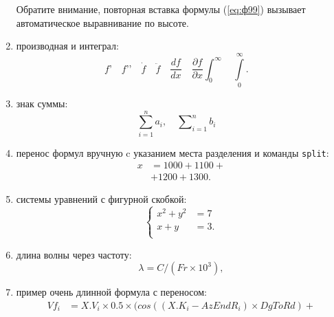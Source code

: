 \begin{enumerate}
Обратите внимание, повторная вставка формулы (\ref{eq:ф99}) вызывает автоматическое выравнивание по высоте.
\item производная и интеграл:
{\zerodisplayskips
	\begin{equation}	
	f’\quad f’’\quad
	\dot{f}\quad \ddot{f} \quad
	\frac{d f}{d x}\quad
	\frac{\partial f}{\partial x}
	\int_0^{\infty}\quad
	\int\limits_0^{\infty}.\quad
	\label{eq:ф10}
	\end{equation}
}%
\item знак суммы:
{\zerodisplayskips
	\begin{equation}	
	\sum_{i=1}^n a_i,\quad
	\sum\nolimits_{i=1}^n b_i\quad
	\label{eq:ф11}
	\end{equation}
}
\item перенос формул вручную c указанием места разделения и команды \verb=split=:
{\zerodisplayskips
	\begin{equation}	
	\begin{split}
	x&=1000+1100+{}\\
	 &+1200+1300.
	\end{split}
	\label{eq:ф12}
	\end{equation}
}
\item системы уравнений с фигурной скобкой:
{%
	\begin{equation}	
	\left\{
	\begin{aligned}
	x^2+y^2&=7\\
	x+y & = 3.\\
	\end{aligned}
	\right.
	\end{equation}
}
\item длина волны через частоту:
{\zerodisplayskips
	\begin{equation}	
	\lambda=C/(Fr \times 10^3),
	\end{equation}
}
\item пример очень длинной формула с переносом:
{\zerodisplayskips
	\begin{equation}
	\begin{split}	
	Vf_i&=X.V_i\times 0.5 \times (cos((X.K_i - AzEndR_i)\times DgToRd) +{}\\

\end{split}
\end{equation}}
\end{enumerate}
